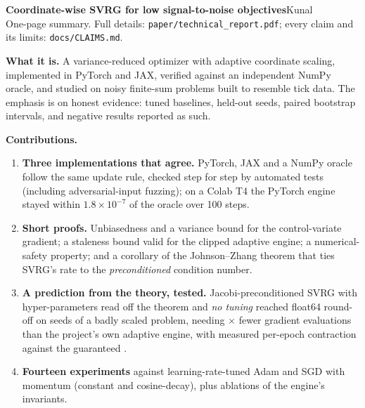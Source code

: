 \documentclass[10pt]{article}
\begin{document}
{\Large\bfseries Coordinate-wise SVRG for low signal-to-noise objectives}\hfill{\small Kunal}\\[1pt]
{\small One-page summary. Full details: \texttt{paper/technical\_report.pdf}; every claim and its limits: \texttt{docs/CLAIMS.md}.}

\textbf{What it is.} A variance-reduced optimizer with adaptive coordinate scaling, implemented in PyTorch and JAX, verified against an independent NumPy oracle, and studied on noisy finite-sum problems built to resemble tick data. The emphasis is on honest evidence: tuned baselines, held-out seeds, paired bootstrap intervals, and negative results reported as such.

\textbf{Contributions.}
\begin{enumerate}
\item \textbf{Three implementations that agree.} PyTorch, JAX and a NumPy oracle follow the same update rule, checked step for step by automated tests (including adversarial-input fuzzing); on a Colab T4 the PyTorch engine stayed within $1.8\times10^{-7}$ of the oracle over 100 steps.
\item \textbf{Short proofs.} Unbiasedness and a variance bound for the control-variate gradient; a staleness bound valid for the clipped adaptive engine; a numerical-safety property; and a corollary of the Johnson--Zhang theorem that ties SVRG's rate to the \emph{preconditioned} condition number.
\item \textbf{A prediction from the theory, tested.} Jacobi-preconditioned SVRG with hyper-parameters read off the theorem and \emph{no tuning} reached float64 round-off on \ExpElevenBadWins{} seeds of a badly scaled problem, needing \ExpElevenSpeedup$\times$ fewer gradient evaluations than the project's own adaptive engine, with measured per-epoch contraction \ExpElevenContractionBad{} against the guaranteed \ExpElevenAlpha.
\item \textbf{Fourteen experiments} against learning-rate-tuned Adam and SGD with momentum (constant and cosine-decay), plus ablations of the engine's invariants.
\end{enumerate}
\end{document}
